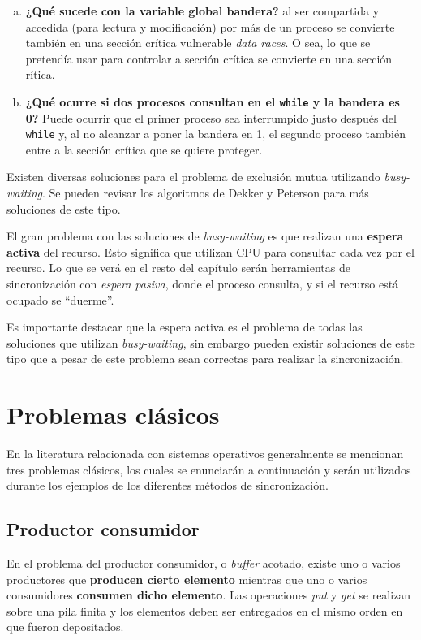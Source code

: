 \begin{enumerate}[a)]

\item \textbf{¿Qué sucede con la variable global bandera?} al ser compartida y
accedida (para lectura y modificación) por más de un proceso se convierte
también  en una sección crítica vulnerable \emph{data races}. O sea, lo que
se pretendía usar para controlar a sección crítica se convierte en una sección
rítica.

\item \textbf{¿Qué ocurre si dos procesos consultan en el \texttt{while} y la
bandera es 0?} Puede ocurrir que el primer proceso sea interrumpido justo
después del \texttt{while} y, al no alcanzar a poner la bandera en 1, el segundo
proceso también entre a la sección crítica que se quiere proteger.

\end{enumerate}

Existen diversas soluciones para el problema de exclusión mutua utilizando
\emph{busy-waiting}. Se pueden revisar los algoritmos de Dekker y Peterson
para más soluciones de este tipo.

El gran problema con las soluciones de \emph{busy-waiting} es que realizan una
\textbf{espera activa} del recurso. Esto significa que utilizan CPU para
consultar cada vez por el recurso. Lo que se verá en el resto del capítulo serán
herramientas de sincronización con \emph{espera pasiva}, donde el proceso
consulta, y si el recurso está ocupado se ``duerme''.

Es importante destacar que la espera activa es el problema de todas las
soluciones que utilizan \emph{busy-waiting}, sin embargo pueden existir
soluciones de este tipo que a pesar de este problema sean correctas para
realizar la sincronización.

\section{Problemas clásicos}
En la literatura relacionada con sistemas operativos generalmente se mencionan
tres problemas clásicos, los cuales se enunciarán a continuación y serán
utilizados durante los ejemplos de los diferentes métodos de sincronización.

\subsection{Productor consumidor}
En el problema del productor consumidor, o \emph{buffer} acotado, existe uno o
varios productores que \textbf{producen cierto elemento} mientras que uno o
varios consumidores \textbf{consumen dicho elemento}. Las operaciones
\emph{put} y \emph{get} se realizan sobre una pila finita y los
elementos deben ser entregados en el mismo orden en que fueron depositados.

